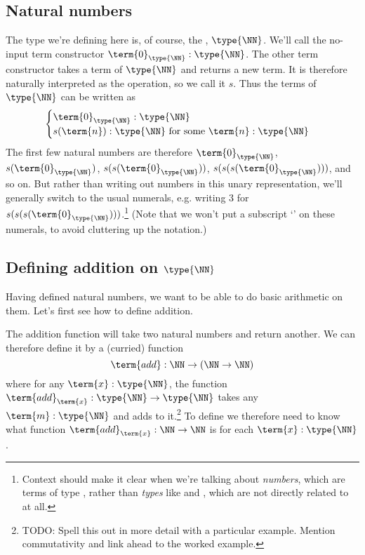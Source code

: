 \newpage
\subsection{Natural numbers}
\label{sec:NaturalNumbers}

The type we're defining here is, of course, the , $\type{\NN}$.  We'll call the no-input term constructor 
$\term{0}_{\type{\NN}}:\type{\NN}$.  
The other term constructor takes a term of $\type{\NN}$ and returns a new term.  It is therefore naturally interpreted as the  operation, so we call it $s$.  
Thus the terms of $\type{\NN}$ can be written as
\[
\begin{cases}
\term{0}_{\type{\NN}}:\type{\NN}
\\
s(\term{n}):\type{\NN}\mbox{ for some }\term{n}:\type{\NN}
\end{cases}
\] 
The first few natural numbers are therefore $\term{0}_{\type{\NN}}$, 
$s(\term{0}_{\type{\NN}})$, $s(s(\term{0}_{\type{\NN}}))$, $s(s(s(\term{0}_{\type{\NN}})))$, and so on.
But rather than writing out numbers in this unary representation, we'll generally switch to the usual numerals, e.g. writing $3$ for $s(s(s(\term{0}_{\type{\NN}})))$.\footnote{
Context should make it clear when we're talking about \emph{numbers}, which are terms of type \type{\NN}, rather than \emph{types} like  and , which are not directly related to \type{\NN} at all.
}  (Note that we won't put a subscript `\NN' on these numerals, to avoid cluttering up the notation.) 


\subsection{Defining addition on $\type{\NN}$}
\label{sec:NaturalNumbers-AdditionOnN}

Having defined natural numbers, we want to be able to do basic arithmetic on them.  Let's first see how to define addition.

The addition function will take two natural numbers and return another.  We can therefore define it by a (curried) function
\[
\term{add}:\NN \to (\NN \to \NN)
\]
where for any $\term{x}:\type{\NN}$, the function
$\term{add}_{\term{x}}: \type{\NN} \to \type{\NN}$
takes any $\term{m}:\type{\NN}$ and adds  to it.\footnote{
TODO: Spell this out in more detail with a particular example.  Mention commutativity and link ahead to the worked example.
}
To define  we therefore need to know what function  $\term{add}_{\term{x}}:\NN \to \NN$ is  for each 
$\term{x}:\type{\NN}$.

